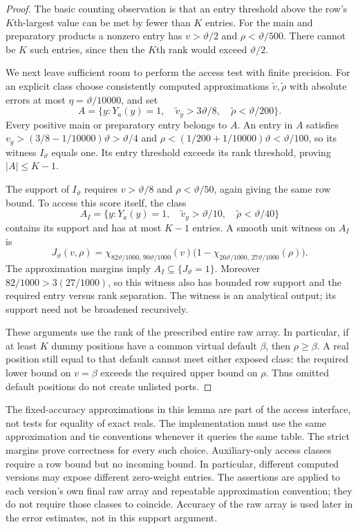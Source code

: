 \begin{proof}
The basic counting observation is that an entry threshold above the row's $K$th-largest value can be met by fewer than $K$ entries. For the main and preparatory products a nonzero entry has
$v>\vartheta/2$ and $\rho<\vartheta/500$.  There cannot be $K$ such
entries, since then the $K$th rank would exceed $\vartheta/2$.

We next leave sufficient room to perform the access test with finite precision. For an explicit class choose consistently computed approximations
$\widetilde v,\widetilde\rho$ with absolute errors at most
$\eta=\vartheta/10000$, and set
\begin{equation}
 A=\{y:Y_a(y)=1,\quad
       \widetilde v_y>3\vartheta/8,\quad
       \widetilde\rho<\vartheta/200\}.
 \label{eq:atom-exposed-class}
\end{equation}
Every positive main or preparatory entry belongs to $A$.  An entry in
$A$ satisfies $v_y>(3/8-1/10000)\vartheta>\vartheta/4$ and
$\rho<(1/200+1/10000)\vartheta<\vartheta/100$, so its witness
$I_{\vartheta}$ equals one.  Its entry threshold exceeds its rank
threshold, proving $|A|\le K-1$.

The support of $I_{\vartheta}$ requires $v>\vartheta/8$ and
$\rho<\vartheta/50$, again giving the same row bound.  To access this
score itself, the class
\[
 A_I=\{y:Y_a(y)=1,\quad
       \widetilde v_y>\vartheta/10,\quad
       \widetilde\rho<\vartheta/40\}
\]
contains its support and has at most $K-1$ entries.  A smooth unit witness
on $A_I$ is
\[
 J_{\vartheta}(v,\rho)=
  \chi_{82\vartheta/1000,\,90\vartheta/1000}(v)
  \bigl(1-\chi_{26\vartheta/1000,\,27\vartheta/1000}(\rho)\bigr).
\]
The approximation margins imply $A_I\subseteq\{J_{\vartheta}=1\}$.
Moreover $82/1000>3(27/1000)$, so this witness also has bounded row
support and the required entry versus rank separation.  The witness is
an analytical output; its support need not be broadened recursively.

These arguments use the rank of the prescribed entire raw array.
In particular, if at least $K$ dummy positions have a common virtual
default $\beta$, then $\rho\ge\beta$.  A real position still equal to
that default cannot meet either exposed class: the required lower bound
on $v=\beta$ exceeds the required upper bound on $\rho$.  Thus omitted
default positions do not create unlisted ports.
\end{proof}

The fixed-accuracy approximations in this lemma are part of the access
interface, not tests for equality of exact reals.  The implementation
must use the same approximation and tie conventions whenever it queries
the same table.  The strict margins prove correctness for every such
choice.  Auxiliary-only access classes require a row bound but no
incoming bound.
In particular, different computed versions may expose different
zero-weight entries.  The assertions are applied to each version's own
final raw array and repeatable approximation convention; they do not
require those classes to coincide.  Accuracy of the raw array is used
later in the error estimates, not in this support argument.


